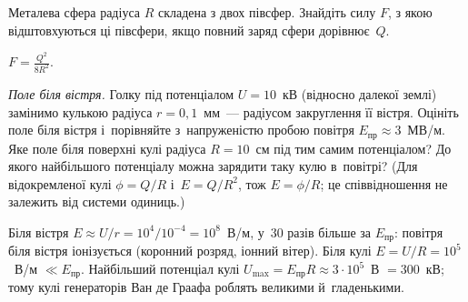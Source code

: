 \begin{problem}%
    Металева сфера радіуса $R$ складена з двох півсфер. Знайдіть силу $F$, з якою відштовхуються
    ці півсфери, якщо повний заряд сфери дорівнює~$Q$.
    \begin{solution}
    	$F= \frac{Q^2}{8R^2}$.
    \end{solution}
\end{problem}

\begin{problem}%
    \emph{Поле біля вістря.} Голку під потенціалом $U=10$~кВ (відносно далекої землі)
    замінимо кулькою радіуса $r=0{,}1$~мм~--- радіусом закруглення її вістря. Оцініть поле
    біля вістря і~порівняйте з~напруженістю пробою повітря $E_\text{пр}\approx3$~МВ/м.
    Яке поле біля поверхні кулі радіуса $R=10$~см під тим самим потенціалом? До якого
    найбільшого потенціалу можна зарядити таку кулю в~повітрі? (Для відокремленої кулі
    $\phi=Q/R$ і~$E=Q/R^2$, тож $E=\phi/R$; це співвідношення не залежить від системи
    одиниць.)
    \begin{solution}
    	Біля вістря $E\approx U/r=10^{4}/10^{-4}=10^{8}$~В/м, у~30 разів більше за $E_\text{пр}$: повітря біля вістря іонізується (коронний розряд, іонний вітер). Біля кулі $E=U/R=10^{5}$~В/м $\ll E_\text{пр}$. Найбільший потенціал кулі $U_{\max}=E_\text{пр}R\approx3\cdot10^{5}$~В $=300$~кВ; тому кулі генераторів Ван де Граафа роблять великими й~гладенькими.
    \end{solution}
\end{problem}


